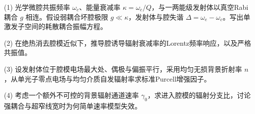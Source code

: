 (1) 光学微腔共振频率 \(\omega_c\)、能量衰减率 \(\kappa=\omega_c/Q\)，与一两能级发射体以真空Rabi耦合 \(g\) 相连。假设弱耦合坏腔极限 \(g\ll\kappa\)，发射体与腔失谐 \(\Delta=\omega_e-\omega_c\)。写出单激发子空间的耗散耦合振幅方程。

(2) 在绝热消去腔模近似下，推导腔诱导辐射衰减率的Lorentz频率响应，以及严格共振值。

(3) 设发射体位于腔模电场最大处、偶极与偏振平行，采用均匀无损背景折射率 \(n\)，从单光子零点电场与均匀介质自发辐射率求标准Purcell增强因子。

(4) 考虑一个额外不可控的背景辐射通道速率 \(\gamma_0\)，求进入腔模的辐射分支比，讨论强耦合与超窄线宽时为何简单速率模型失效。
